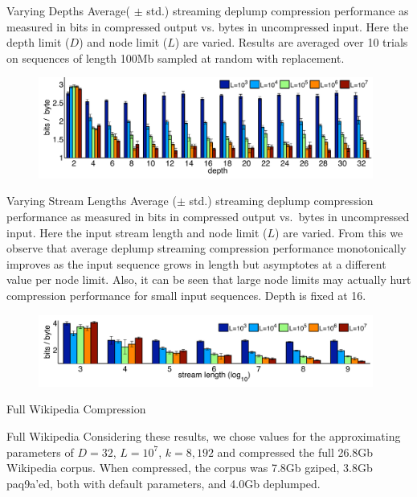 \documentclass{beamer}
\begin{document}
\begin{frame}[t]{Varying Depths}
 Average( $\pm$ std.) streaming deplump compression performance as measured in bits in compressed output vs. bytes in uncompressed input. Here the depth limit ($D$) and node limit ($L$) are varied. Results are averaged over 10 trials on sequences of length 100Mb sampled at random with replacement.
   	\begin{figure}[t]
		\begin{center}
			\includegraphics[width = 11cm]{../figs/varying_depths.pdf}
		\end{center}
	\end{figure}

\end{frame}

\begin{frame}[t]{Varying Stream Lengths}
	Average ($\pm$ std.) streaming deplump compression performance as measured in bits in compressed output vs.~bytes in uncompressed input.  Here the input stream length and node limit ($L$) are varied.  From this we observe that average deplump streaming compression performance monotonically improves as the input sequence grows in length but asymptotes at a different value per node limit. Also, it can be seen that large node limits may actually hurt compression performance for small input sequences.  Depth is fixed at 16.
	   	\begin{figure}[t]
		\begin{center}
			\includegraphics[width = 11cm]{../figs/varying_stream_length.pdf}
		\end{center}
	\end{figure}

\end{frame}

\begin{frame}[t]{Full Wikipedia Compression}
	\begin{block}{Full Wikipedia}
		Considering these results, we chose values for the approximating parameters of $D=32$, $L=10^7$, $k=8,192$ and compressed the full 26.8Gb Wikipedia corpus.  When compressed, the corpus was 7.8Gb gziped, 3.8Gb paq9a'ed, both with default parameters, and 4.0Gb deplumped.
	\end{block}
\end{frame}
\end{document}
